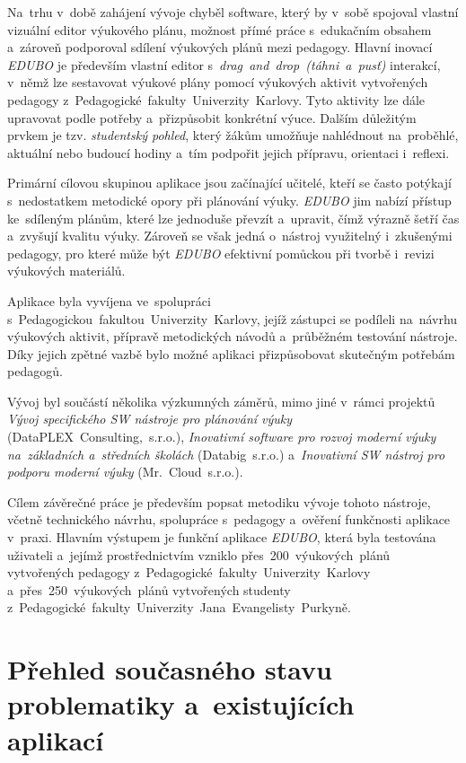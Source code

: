 \documentclass[male,czech,api_bc]{kitheses}
\begin{document}
Na~trhu v~době zahájení vývoje chyběl software, který by v~sobě spojoval vlastní vizuální editor výukového plánu, možnost přímé práce s~edukačním obsahem a~zároveň podporoval sdílení výukových plánů mezi pedagogy. Hlavní inovací \textit{EDUBO} je především vlastní editor s~\textit{drag~and~drop~(táhni~a~pusť)} interakcí, v~němž lze sestavovat výukové plány pomocí výukových aktivit vytvořených pedagogy z~Pedagogické~fakulty~Univerzity~Karlovy. Tyto aktivity lze dále upravovat podle potřeby a~přizpůsobit konkrétní výuce. Dalším důležitým prvkem je tzv. \textit{studentský pohled}, který žákům umožňuje nahlédnout na~proběhlé, aktuální nebo budoucí hodiny a~tím podpořit jejich přípravu, orientaci i~reflexi.

Primární cílovou skupinou aplikace jsou začínající učitelé, kteří se často potýkají s~nedostatkem metodické opory při plánování výuky. \textit{EDUBO} jim nabízí přístup ke~sdíleným plánům, které lze jednoduše převzít a~upravit, čímž výrazně šetří čas a~zvyšují kvalitu výuky. Zároveň se však jedná o~nástroj využitelný i~zkušenými pedagogy, pro které může být \textit{EDUBO} efektivní pomůckou při tvorbě i~revizi výukových materiálů.

Aplikace byla vyvíjena ve~spolupráci s~Pedagogickou~fakultou~Univerzity~Karlovy, jejíž zástupci se podíleli na~návrhu výukových aktivit, přípravě metodických návodů a~průběžném testování nástroje. Díky jejich zpětné vazbě bylo možné aplikaci přizpůsobovat skutečným potřebám pedagogů.

Vývoj byl součástí několika výzkumných záměrů, mimo jiné v~rámci projektů \textit{Vývoj specifického SW nástroje pro plánování výuky} (DataPLEX~Consulting,~s.r.o.), \textit{Inovativní software pro rozvoj moderní výuky na~základních a~středních školách} (Databig~s.r.o.) a~\textit{Inovativní SW nástroj pro podporu moderní výuky} (Mr.~Cloud~s.r.o.).

\newpage

Cílem závěrečné práce je především popsat metodiku vývoje tohoto nástroje, včetně technického návrhu, spolupráce s~pedagogy a~ověření funkčnosti aplikace v~praxi. Hlavním výstupem je funkční aplikace \textit{EDUBO}, která byla testována uživateli a~jejímž prostřednictvím vzniklo přes~200~výukových~plánů vytvořených pedagogy z~Pedagogické~fakulty~Univerzity~Karlovy a~přes~250~výukových~plánů vytvořených studenty z~Pedagogické~fakulty~Univerzity~Jana~Evangelisty~Purkyně.

\chapter{Přehled současného stavu problematiky a~existujících aplikací}
\end{document}
